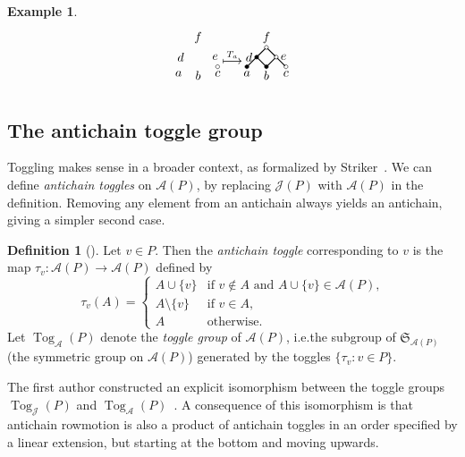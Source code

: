 \documentclass[10pt]{amsart}
\theoremstyle{definition}
\newtheorem{defi}[theo]{Definition}
\newtheorem{exam}[theo]{Example}
\newcommand{\ie}{i.e.}
\newcommand{\defn}[1]{\emph{#1}}
\newcommand{\ra}{\rightarrow}
\newcommand{\sm}{\setminus}
\DeclareMathOperator{\tog}{Tog}
\newcommand{\cala}{\mathcal{A}}
\newcommand{\calj}{\mathcal{J}}
\begin{document}
\begin{exam}
\[\begin{tikzpicture}[scale=.274]
\begin{scope}[shift={(35,-4)}]
\draw (2,0) circle [radius=0.2];
\node[above] at (0,2) {$f$};
\node[left] at (-1,1) {$d$};
\node[right] at (1,1) {$e$};
\node[below] at (-2,0) {$a$};
\node[below] at (0,0) {$b$};
\node[below] at (2,0) {$c$};
\end{scope}
\node at (38.5,-3) {$\stackrel{T_a}{\longmapsto}$};
\begin{scope}[shift={(42,-4)}]
\draw[thick] (-0.1, 1.9) -- (-0.9, 1.1);
\draw[thick] (0.1, 1.9) -- (0.9, 1.1);
\draw[thick] (-1.1, 0.9) -- (-1.9, 0.1);
\draw[thick] (-0.9, 0.9) -- (-0.1, 0.1);
\draw[thick] (0.9, 0.9) -- (0.1, 0.1);
\draw[thick] (1.1, 0.9) -- (1.9, 0.1);
\draw (0,2) circle [radius=0.2];
\draw[fill] (-1,1) circle [radius=0.2];
\draw (1,1) circle [radius=0.2];
\draw[fill] (-2,0) circle [radius=0.2];
\draw[fill] (0,0) circle [radius=0.2];
\draw (2,0) circle [radius=0.2];
\node[above] at (0,2) {$f$};
\node[left] at (-1,1) {$d$};
\node[right] at (1,1) {$e$};
\node[below] at (-2,0) {$a$};
\node[below] at (0,0) {$b$};
\node[below] at (2,0) {$c$};
\end{scope}
\end{tikzpicture}
\]
\end{exam}

\subsection{The antichain toggle group}
Toggling makes sense in a broader context, as formalized by Striker~\cite{strikergentog}. We can define \emph{antichain toggles} on $\cala(P)$, by replacing $\calj(P)$ with $\cala(P)$ in the definition. Removing any element from an antichain always yields an antichain, giving a simpler second case. 
\begin{defi}[\cite{strikergentog}]\label{def:comb-tau}
Let $v\in P$. Then the \defn{antichain toggle} corresponding to $v$ is the map $\tau_v: \cala(P)\ra \cala(P)$
defined by
\[
\tau_v(A)=\begin{cases}
A\cup\{v\} &\text{if $v\not\in A$ and $A\cup\{v\}\in\cala(P)$,}\\
A\sm\{v\} &\text{if $v\in A$,}\\
A &\text{otherwise.}
\end{cases}
\]
Let $\tog_\cala(P)$ denote the \defn{toggle group} of $\cala(P)$, \ie the subgroup of
$\mathfrak{S}_{\cala (P)}$ (the symmetric group on $\cala (P)$) generated by the toggles $\{\tau_v : v\in P\}$.
\end{defi}
The first author constructed an explicit isomorphism between the toggle groups $\tog_\calj(P)$ and
$\tog_\cala(P)$~\cite{antichain-toggling}.
A consequence of this isomorphism is that antichain rowmotion is also a product of antichain toggles in an order specified by a linear extension, but starting at the bottom and moving upwards.
\end{document}
